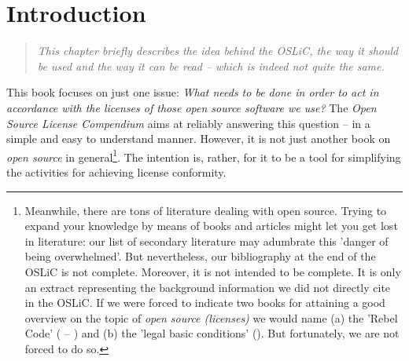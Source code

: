 %
%
%
%
%




\chapter{Introduction}

\footnotesize \begin{quote}\itshape
This chapter briefly describes the idea behind the OSLiC, the way it should be
used and the way it can be read -- which is indeed not quite the same.
\end{quote}
\normalsize{}

This book focuses on just one issue: \emph{What needs to be done in order to act
in accordance with the licenses of those \emph{open source software} we use?}
The \emph{Open Source License Compendium} aims at reliably answering this
question -- in a simple and easy to understand manner. However, it is not just
another book on \emph{open source} in ge\-ne\-ral\footnote{Meanwhile, there are
tons of literature dealing with open source. Trying to expand your knowledge by
means of books and articles might let you get lost in literature: our list of
secondary literature may adumbrate this 'danger of being overwhelmed'. But
nevertheless, our bibliography at the end of the OSLiC is not complete.
Moreover, it is not intended to be complete. It is only an extract representing
the background information we did not directly cite in the OSLiC. If we were
forced to indicate two books for attaining a good overview on the topic of
\emph{open source (licenses)} we would name (a) the 'Rebel Code' (\cite[for a
German version cf.][\nopage passim]{Moody2001a} -- \cite[for an English version
cf.][passim]{Moody2002a}) and (b) the 'legal basic conditions'
(\cite[cf.][\nopage passim]{JaeMet2011a}). But fortunately, we are not forced to
do so.}. The intention is, rather, for it to be a tool for simplifying the
activities for achieving license conformity.

